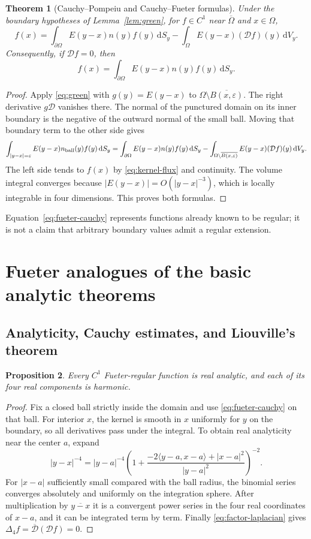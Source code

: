 \documentclass[11pt,a4paper]{article}
\numberwithin{equation}{section}
\newtheorem{theorem}{Theorem}[section]
\newtheorem{proposition}[theorem]{Proposition}
\theoremstyle{definition}
\theoremstyle{remark}
\newcommand{\cD}{\mathcal D}
\newcommand{\lap}{\Delta_4}
\newcommand{\dd}{\,\mathrm d}
\begin{document}
\begin{theorem}[Cauchy--Pompeiu and Cauchy--Fueter formulas]
\label{thm:fueter-cauchy}
Under the boundary hypotheses of Lemma~\ref{lem:green}, for $f\in C^1$
near $\overline\Omega$ and $x\in\Omega$,
\begin{equation}\label{eq:pompeiu}
 f(x)=\int_{\partial\Omega}E(y-x)n(y)f(y)\dd S_y
       -\int_\Omega E(y-x)(\cD f)(y)\dd V_y.
\end{equation}
Consequently, if $\cD f=0$, then
\begin{equation}\label{eq:fueter-cauchy}
 \boxed{\displaystyle
 f(x)=\int_{\partial\Omega}E(y-x)n(y)f(y)\dd S_y.}
\end{equation}
\end{theorem}
\begin{proof}
Apply \eqref{eq:green} with $g(y)=E(y-x)$ to
$\Omega\setminus\overline{B(x,\varepsilon)}$. The right derivative
$g\cD$ vanishes there. The normal of the punctured domain on its inner
boundary is the negative of the outward normal of the small ball. Moving
that boundary term to the other side gives
\[
 \int_{|y-x|=\varepsilon}E(y-x)n_{\rm ball}(y)f(y)\dd S_y
 =\int_{\partial\Omega}E(y-x)n(y)f(y)\dd S_y
   -\int_{\Omega\setminus\overline{B(x,\varepsilon)}}
          E(y-x)(\cD f)(y)\dd V_y.
\]
The left side tends to $f(x)$ by \eqref{eq:kernel-flux} and continuity. The
volume integral converges because $|E(y-x)|=O(|y-x|^{-3})$, which is locally
integrable in four dimensions. This proves both formulas.
\end{proof}
Equation~\eqref{eq:fueter-cauchy} represents functions already known to be
regular; it is not a claim that arbitrary boundary values admit a regular
extension.

\section{Fueter analogues of the basic analytic theorems}
\label{sec:fueter-consequences}
\subsection{Analyticity, Cauchy estimates, and Liouville's theorem}
\begin{proposition}\label{prop:fueter-analytic}
Every $C^1$ Fueter-regular function is real analytic, and each of its four
real components is harmonic.
\end{proposition}
\begin{proof}
Fix a closed ball strictly inside the domain and use
\eqref{eq:fueter-cauchy} on that ball. For interior $x$, the kernel is smooth
in $x$ uniformly for $y$ on the boundary, so all derivatives pass under the
integral. To obtain real analyticity near the center $a$, expand
\[
 |y-x|^{-4}
 =|y-a|^{-4}\left(1+
 \frac{-2\langle y-a,x-a\rangle+|x-a|^2}{|y-a|^2}\right)^{-2}.
\]
For $|x-a|$ sufficiently small compared with the ball radius, the binomial
series converges absolutely and uniformly on the integration sphere. After
multiplication by $\overline{y-x}$ it is a convergent power series in the
four real coordinates of $x-a$, and it can be integrated term by term.
Finally \eqref{eq:factor-laplacian} gives
$\lap f=\overline{\cD}(\cD f)=0$.
\end{proof}
\end{document}
